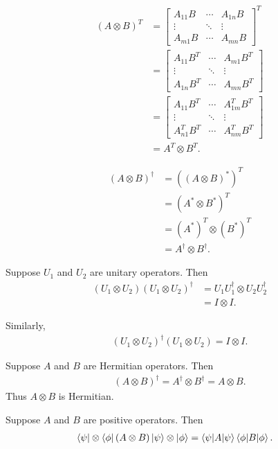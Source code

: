 \begin{align*}
	(A\otimes B)^T &=
	\begin{bmatrix}
		A_{11} B & \cdots & A_{1n} B \\ 
		\vdots & \ddots  & \vdots \\ 
		A_{m1}B & \cdots & A_{mn} B
	\end{bmatrix}^T \\
	&=
	\begin{bmatrix}
		A_{11} B^T & \cdots & A_{m1} B^T \\ 
		\vdots & \ddots  & \vdots \\ 
		A_{1n} B^T & \cdots & A_{mn} B^T
	\end{bmatrix} \\
	&=
	\begin{bmatrix}
		A_{11} B^T & \cdots & A_{1m}^T B^T \\ 
		\vdots & \ddots  & \vdots \\ 
		A_{n1}^T B^T & \cdots & A_{nm}^T B^T
	\end{bmatrix} \\
	&= A^T \otimes B^T.
\end{align*}


\begin{align*}
	(A\otimes B)^\dagger&=((A \otimes B)^*)^T	\\
		&= (A^* \otimes B^*)^T\\
		&= (A^*)^T \otimes (B^*)^T\\
		&= A^\dagger \otimes B^\dagger.
\end{align*}

Suppose $U_1$ and $U_2$ are unitary operators. Then
\begin{align*}
	(U_1 \otimes U_2) (U_1 \otimes U_2)^\dagger &=U_1 U_1^\dagger \otimes U_2 U_2^\dagger\\
		&= I \otimes I.
\end{align*}

Similarly,
\begin{align*}
	(U_1 \otimes U_2)^\dagger (U_1 \otimes U_2)  = I \otimes I.
\end{align*}

Suppose $A$ and $B$ are Hermitian operators. Then
\begin{align}
(A \otimes B)^\dagger = A^\dagger \otimes B^\dagger = A \otimes B.
\end{align}
Thus $A \otimes B$ is Hermitian.



Suppose $A$ and $B$ are positive operators. Then
\begin{align*}
	\bra{\psi} \otimes \bra{\phi} (A \otimes B) \ket{\psi} \otimes \ket{\phi} &= \braket{\psi |A| \psi} \braket{\phi | B | \phi}.
\end{align*}

